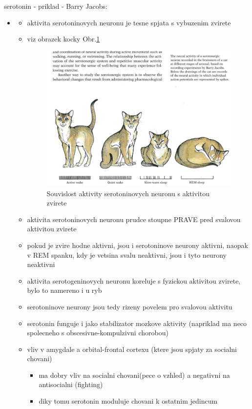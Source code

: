 \documentclass[journal,onecolumn]{IEEEtrancz}
\begin{document}
serotonin - priklad - Barry Jacobs: 
\begin{itemize}
	\item 
	\begin{itemize}
		\item aktivita serotoninovych neuronu je tesne spjata s vybuzenim zvirete
		\item viz obrazek kocky Obr.\ref{cat} 

		\begin{figure}[ht]
			\centering
				\includegraphics[width=10.0cm]{fig/cat.png}
			\caption{Souvislost aktivity serotoninovych neuronu s aktivitou zvirete}
			\label{cat}
		\end{figure}

			\vspace{3mm}
		\item aktivita serotoninovych neuronu prudce stoupne PRAVE pred svalovou aktivitou zvirete
		\item pokud je zvire hodne aktivni, jsou i serotoninove neurony aktivni, naopak v REM spanku, kdy je vetsina svalu neaktivni, jsou i tyto neurony neaktivni
			\vspace{3mm}
		\item aktivita serotogeninovych neuronu koreluje s fyzickou aktivitou zvirete, bylo to namereno i u ryb
		\item serotoninove neurony jsou tedy rizeny povelem pro svalovou aktivitu
			\vspace{3mm}
		\item serotonin funguje i jako stabilizator mozkove aktivity (napriklad ma neco spolecneho s obscesivne-kompulzivni chorobou)
			\vspace{3mm}
		\item vliv v amygdale a orbital-frontal cortexu (ktere jsou spjaty za socialni chovani)	
		\begin{itemize}
			\item ma dobry vliv na socialni chovani(pece o vzhled) a negativni na antisocialni (fighting)
			\item diky tomu serotonin moduluje chovani k ostatnim jedincum
				\vspace{3mm}
		\end{itemize}


\end{itemize}
\end{itemize}
\end{document}
